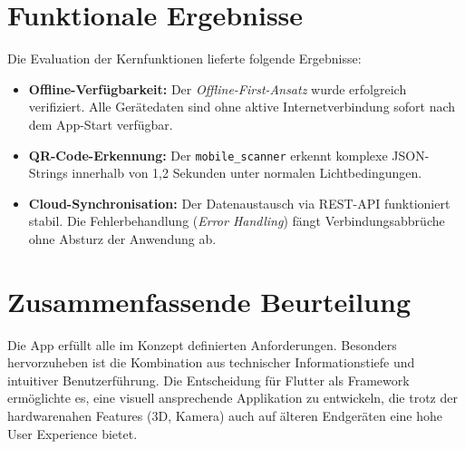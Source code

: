 \section{Funktionale Ergebnisse}
Die Evaluation der Kernfunktionen lieferte folgende Ergebnisse:
\begin{itemize}
    \item \textbf{Offline-Verfügbarkeit:} Der \textit{Offline-First-Ansatz} wurde erfolgreich verifiziert. Alle Gerätedaten sind ohne aktive Internetverbindung sofort nach dem App-Start verfügbar.
    \item \textbf{QR-Code-Erkennung:} Der \texttt{mobile\_scanner} erkennt komplexe JSON-Strings innerhalb von 1,2 Sekunden unter normalen Lichtbedingungen.
    \item \textbf{Cloud-Synchronisation:} Der Datenaustausch via REST-API funktioniert stabil. Die Fehlerbehandlung (\textit{Error Handling}) fängt Verbindungsabbrüche ohne Absturz der Anwendung ab.
\end{itemize}

\section{Zusammenfassende Beurteilung}
Die App erfüllt alle im Konzept definierten Anforderungen. Besonders hervorzuheben ist die Kombination aus technischer Informationstiefe und intuitiver Benutzerführung. Die Entscheidung für Flutter als Framework ermöglichte es, eine visuell ansprechende Applikation zu entwickeln, die trotz der hardwarenahen Features (3D, Kamera) auch auf älteren Endgeräten eine hohe User Experience bietet.